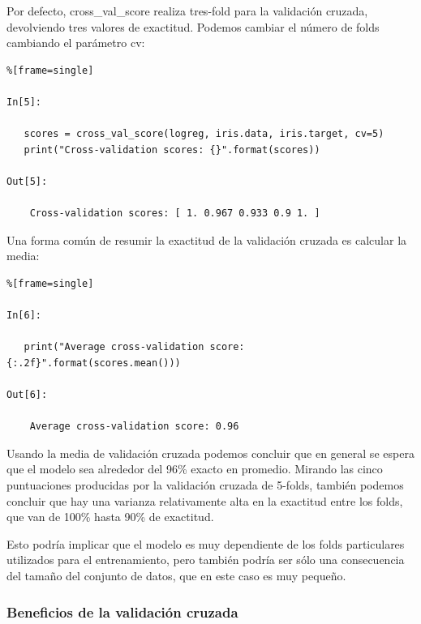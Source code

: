 Por defecto,  {\ttfamily cross\_val\_score}  realiza tres-fold para la validación cruzada,
 devolviendo tres valores de exactitud. Podemos cambiar el número de  folds 
 cambiando el  parámetro {\ttfamily cv}:


\begin{lstlisting}%[frame=single]

In[5]:

   scores = cross_val_score(logreg, iris.data, iris.target, cv=5)
   print("Cross-validation scores: {}".format(scores))

Out[5]:
    
    Cross-validation scores: [ 1. 0.967 0.933 0.9 1. ]

\end{lstlisting}


Una forma común de resumir la exactitud   de la validación cruzada es calcular la media:

\begin{lstlisting}%[frame=single]

In[6]:

   print("Average cross-validation score: {:.2f}".format(scores.mean()))

Out[6]:

    Average cross-validation score: 0.96

\end{lstlisting}

Usando la media de validación cruzada podemos concluir que en general se espera que el modelo sea alrededor del 96\%  exacto  en promedio. Mirando las cinco puntuaciones producidas por la validación cruzada de 5-folds, también podemos concluir que hay una varianza relativamente alta en la exactitud entre los  folds, que van de 100\%   hasta 90\%  de  exactitud. 

Esto podría implicar que el modelo es muy dependiente de los folds  particulares utilizados para el entrenamiento, pero también podría ser sólo una consecuencia del tamaño del conjunto de datos, que en este caso es muy pequeño.


\subsubsection{Beneficios de la validación cruzada}

